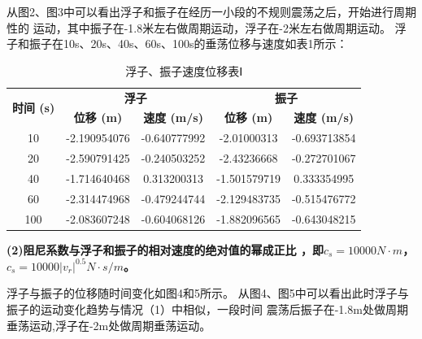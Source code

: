 \documentclass{my_paper}
\begin{document}
从图2、图3中可以看出浮子和振子在经历一小段的不规则震荡之后，开始进行周期性的
运动，其中振子在-1.8米左右做周期运动，浮子在-2米左右做周期运动。
浮子和振子在10s、20s、40s、60s、100s的垂荡位移与速度如表1所示：
\begin{table}[!h]
    \centering
        \setlength{\belowcaptionskip}{0.2cm}
      \caption{浮子、振子速度位移表Ⅰ}
    \begin{tabular}{|c|cc|cc|}
    \hline
    \multirow{2}{*}{\textbf{时间 (s)}} & \multicolumn{2}{c|}{\textbf{浮子}}                         & \multicolumn{2}{c|}{\textbf{振子}}                         \\ \cline{2-5} 
                                     & \multicolumn{1}{c|}{\textbf{位移 (m)}} & \textbf{速度 (m/s)} & \multicolumn{1}{c|}{\textbf{位移 (m)}} & \textbf{速度 (m/s)} \\ \hline
    10                               & \multicolumn{1}{c|}{-2.190954076}    & -0.640777992      & \multicolumn{1}{c|}{-2.01000313}    & -0.693713854      \\ \hline
    20                               & \multicolumn{1}{c|}{-2.590791425}    & -0.240503252      & \multicolumn{1}{c|}{-2.43236668}     & -0.272701067      \\ \hline
    40                               & \multicolumn{1}{c|}{-1.714640468}    & 0.313200313       & \multicolumn{1}{c|}{-1.501579719}    & 0.333354995       \\ \hline
    60                               & \multicolumn{1}{c|}{-2.314474968}    & -0.479244744      & \multicolumn{1}{c|}{-2.129483735}    & -0.515476772      \\ \hline
    100                              & \multicolumn{1}{c|}{-2.083607248}    & -0.604068126      & \multicolumn{1}{c|}{-1.882096565}    & -0.643048215      \\ \hline
    \end{tabular}
  
    \end{table}


\noindent\textbf{(2)阻尼系数与浮子和振子的相对速度的绝对值的幂成正比
，即$c_s=10000N\cdot m$，$c_{s}=10000 \lvert v_{r} \rvert^{0.5} N\cdot s/m$。}

浮子与振子的位移随时间变化如图4和5所示。
从图4、图5中可以看出此时浮子与振子的运动变化趋势与情况（1）中相似，一段时间
震荡后振子在-1.8m处做周期垂荡运动,浮子在-2m处做周期垂荡运动。
\end{document}
